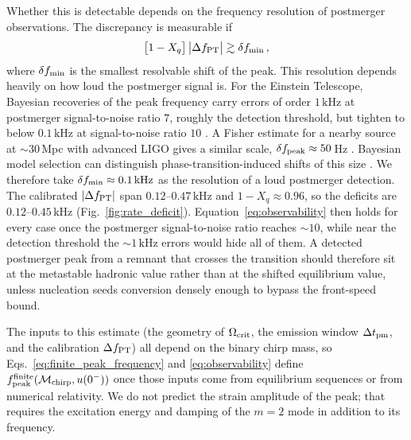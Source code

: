 \documentclass[10pt,superscriptaddress,
amsmath,aps,prc,twocolumn,nofootinbib,floatfix]{revtex4-1}
\newcommand{\kHz}{\text{kHz}}
\begin{document}
{Whether this is detectable depends on the frequency resolution of postmerger observations.
The discrepancy is measurable if
\begin{equation}
\bigl[1-X_q\bigr]\,\bigl|\Delta f_{\rm PT}\bigr|
\gtrsim\delta f_{\rm min}\,,
\label{eq:observability}
\end{equation}
where $\delta f_{\rm min}$ is the smallest resolvable shift of the peak.
This resolution depends heavily on how loud the postmerger signal is.
For the Einstein Telescope, Bayesian recoveries of the peak frequency carry errors of order $1\,\kHz$ at postmerger signal-to-noise ratio $7$, roughly the detection threshold, but tighten to below $0.1\,\kHz$ at signal-to-noise ratio $10$ \cite{Breschi:2022ens}.
A Fisher estimate for a nearby source at ${\sim}30\,$Mpc with advanced LIGO gives a similar scale, $\delta f_{\rm peak}\approx50\,$Hz \cite{Clark:2015zxa}.
Bayesian model selection can distinguish phase-transition-induced shifts of this size \cite{Prakash:2023afe}.
We therefore take $\delta f_{\rm min}\approx0.1\,\kHz$ as the resolution of a loud postmerger detection.
The calibrated $|\Delta f_{\rm PT}|$ span $0.12$--$0.47\,\kHz$ and $1-X_q\approx0.96$, so the deficits are $0.12$--$0.45\,\kHz$ (Fig.~\ref{fig:rate_deficit}).
Equation~\eqref{eq:observability} then holds for every case once the postmerger signal-to-noise ratio reaches ${\sim}10$, while near the detection threshold the ${\sim}1\,\kHz$ errors would hide all of them.
A detected postmerger peak from a remnant that crosses the transition should therefore sit at the metastable hadronic value rather than at the shifted equilibrium value, unless nucleation seeds conversion densely enough to bypass the front-speed bound.

The inputs to this estimate (the geometry of $\Omega_{\rm crit}$, the emission window $\Delta t_{\rm pm}$, and the calibration $\Delta f_{\rm PT}$) all depend on the binary chirp mass, so Eqs.~\eqref{eq:finite_peak_frequency} and \eqref{eq:observability} define $f_{\rm peak}^{\rm finite}(\mathcal{M}_{\rm chirp},u(0^-))$ once those inputs come from equilibrium sequences or from numerical relativity.
We do not predict the strain amplitude of the peak; that requires the excitation energy and damping of the $m=2$ mode in addition to its frequency.
}
\end{document}
